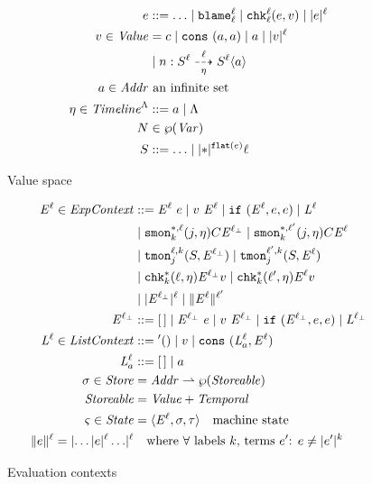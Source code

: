 \documentclass[preprint,onecolumn,9pt]{sigplanconf} %
\begin{document}
\begin{figure}
\begin{align*}
  \mexp &::= \ldots
   \alt \sblame{\mmlab}{\mmlab}
   \alt \schk{\mmlab}{\mmlab}{\mexp}{\mval}
   \alt \sown{\mexp}{\mmlab}
  \\
  \mval \in \Value &=
        \mconstant
   \alt \vcons{\maddr}{\maddr}  
   \alt \maddr
   \alt \sown{\mval}{\mmlab} \\
&  \alt \bclos{\mname}{\mscon}{\mmlab}{\mmlab}{\mtimeline}{\mscon}{\mmlab}{\maddr}
  \\
  \maddr \in \Addr &\text{ an infinite set} \\
  \mstimeline \in \Timeline^{\toplevel} &::= \maddr \alt \toplevel \\
  \mnames &\in \wp(\Var) %
  \\
  \mscon &::= \ldots
   \alt \sown*{\sflat{\mexp}}{\mmlab}
\end{align*}
\caption{Value space}
\label{fig:values}
\end{figure}

\begin{figure}
\begin{align*}
\mathit{E}^{\ell} \in \mathit{ExpContext} &::=
      \mathit{E}^{\ell}\ e
 \mid v\ \mathit{E}^{\ell}
 \mid {\tt if}{\ }({\mathit{E}^{\ell},e,e})
 \mid \mathit{L}^{\ell} \\
&\mid {\tt smon}{^{*,\ell}_{k}}({j, \eta}){C}{\mathit{E}^{\ell_\bot}}
 \mid {\tt smon}{^{*,\ell^\prime}_{k}}({j, \eta}){C}{\mathit{E}^{\ell}} \\
&\mid {\tt tmon}{^{\ell,k}_{j}}({S, \mathit{E}^{\ell_\bot}})
 \mid {\tt tmon}{^{\ell^\prime,k}_{j}}({S, \mathit{E}^{\ell}}) \\
&\mid {\tt chk}{^{*}_{k}}({\ell, \eta}){\mathit{E}^{\ell_\bot}}{v}
 \mid {\tt chk}{^{*}_{k}}({\ell^\prime, \eta}){\mathit{E}^{\ell}}{v} \\
&\mid \lvert\mathit{E}^{\ell_\bot}\rvert^{\ell}
 \mid \lVert\mathit{E}^{\ell}\rVert^{\ell^\prime}
\\
\mathit{E}^{\ell_\bot} &::=
      [\,]
 \mid \mathit{E}^{\ell_\bot}\ e
 \mid v\ \mathit{E}^{\ell_\bot}
 \mid {\tt if}{\ }({\mathit{E}^{\ell_\bot},e,e})
 \mid \mathit{L}^{\ell_\bot}
\\
\mathit{L}^{\ell} \in \mathit{ListContext} &::=
      {\tt '()}
 \mid v
 \mid {\tt \tt cons}{\ }({\mathit{L}^{\ell}_a, \mathit{E}^{\ell}})
 \\
\mathit{L}^{\ell}_a &::=
 [\,] \mid a
\\
\sigma \in \mathit{Store} &= \mathit{Addr} \mathrel{\rightharpoonup} \wp(\mathit{Storeable}) \\
\mathit{Storeable} &= \mathit{Value} + \mathit{Temporal} \\
\varsigma \in \mathit{State} &= \langle\mathit{E}^{\ell}, \sigma, \tau\rangle \quad\text{machine state} \\
\lVert e\rVert^{\ell} = \lvert \ldots \lvert e\rvert^{\ell} \ldots \rvert^{\ell}
&\quad\text{where $\forall$ labels $k$, terms $e^\prime$: $e \neq \lvert e^\prime\rvert^{k}$}
\end{align*}
\caption{Evaluation contexts}
\label{fig:ctx}
\end{figure}
\end{document}
